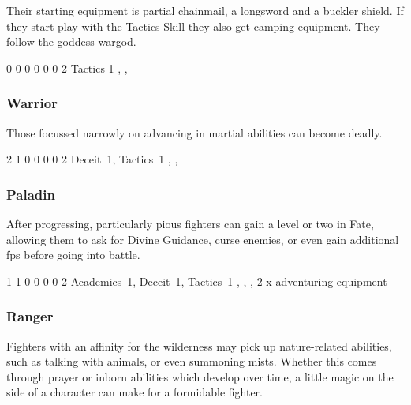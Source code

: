 {\begin{multicols}{2}
Their starting equipment is partial chainmail, a longsword and a buckler shield.
If they start play with the Tactics Skill they also get camping equipment.
They follow the goddess \gls{wargod}.


{0}%
{0}%
{{0}%
{0}%
{0}}%
{0}%
{2}%
{Tactics 1\knacks{\adrenalinesurge}}%
{\longsword, \partialleather, \bucklar}%
{\addtocounter{fp}{5}}

\subsubsection{Warrior}

Those focussed narrowly on advancing in martial abilities can become deadly.


{2}%
{1}%
{{0}%
{0}%
{0}}%
{0}%
{2}%
{Deceit~1, Tactics~1\knacks{\adrenalinesurge, \charge, \firststrike}}%
{\longsword, \partialchain, \bucklar}%
{\addtocounter{fp}{5}}

\subsubsection{Paladin}

After progressing, particularly pious fighters can gain a level or two in Fate, allowing them to ask for Divine Guidance, curse enemies, or even gain additional \glspl{fp} before going into battle.


{1}%
{1}%
{{0}%
{0}%
{0}}%
{0}%
{2}%
{Academics~1, Deceit~1, Tactics~1
\knacks{\adrenalinesurge, \charge}}%
{\greatsword, \partialchain, \bucklar, 2 x adventuring equipment}%
{\addtocounter{fp}{5}}

\subsubsection{Ranger}

Fighters with an affinity for the wilderness may pick up nature-related abilities, such as talking with animals, or even summoning mists.
Whether this comes through prayer or inborn abilities which develop over time, a little magic on the side of a character can make for a formidable fighter.


\end{multicols}}
